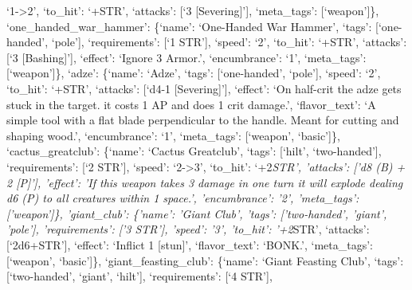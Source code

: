 \documentclass[
  letterpaper,
  DIV=11,
  numbers=noendperiod]{scrartcl}
\begin{document}
`1-\textgreater2', `to\_hit': `+STR', `attacks': {[}`3
{[}Severing{]}'{]}, `meta\_tags': {[}`weapon'{]}\},
`one\_handed\_war\_hammer': \{`name': `One-Handed War Hammer', `tags':
{[}`one-handed', `pole'{]}, `requirements': {[}`1 STR'{]}, `speed': `2',
`to\_hit': `+STR', `attacks': {[}`3 {[}Bashing{]}'{]}, `effect': `Ignore
3 Armor.', `encumbrance': `1', `meta\_tags': {[}`weapon'{]}\}, `adze':
\{`name': `Adze', `tags': {[}`one-handed', `pole'{]}, `speed': `2',
`to\_hit': `+STR', `attacks': {[}`d4-1 {[}Severing{]}'{]}, `effect': `On
half-crit the adze gets stuck in the target. \nRemoving it costs 1 AP
and does 1 crit damage.', `flavor\_text': `A simple tool with a flat
blade perpendicular to the handle. Meant for cutting and shaping wood.',
`encumbrance': `1', `meta\_tags': {[}`weapon', `basic'{]}\},
`cactus\_greatclub': \{`name': `Cactus Greatclub', `tags': {[}`hilt',
`two-handed'{]}, `requirements': {[}`2 STR'{]}, `speed':
`2-\textgreater3', `to\_hit': `+2\emph{STR', 'attacks': {[}'d8 (B) + 2
{[}P{]}'{]}, 'effect': 'If this weapon takes 3 damage in one turn it
will explode dealing d6 (P) to all creatures within 1 space.',
'encumbrance': '2', 'meta\_tags': {[}'weapon'{]}\}, 'giant\_club':
\{'name': 'Giant Club', 'tags': {[}'two-handed', 'giant', 'pole'{]},
'requirements': {[}'3 STR'{]}, 'speed': '3', 'to\_hit': '+2}STR',
`attacks': {[}`2d6+STR'{]}, `effect': `Inflict 1 {[}stun{]}',
`flavor\_text': `BONK.', `meta\_tags': {[}`weapon', `basic'{]}\},
`giant\_feasting\_club': \{`name': `Giant Feasting Club', `tags':
{[}`two-handed', `giant', `hilt'{]}, `requirements': {[}`4 STR'{]},
\end{document}
